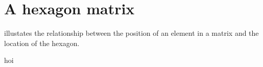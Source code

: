 \documentclass[onecolumn]{article}
\begin{document}
\section*{A hexagon matrix}
 illustates the relationship between the position of an element in a matrix and the location of the hexagon.




hoi
\end{document}
